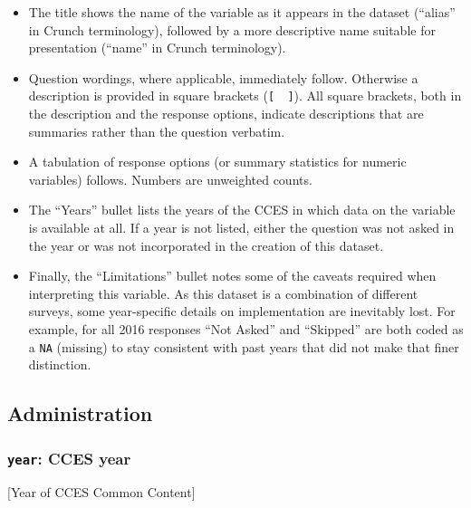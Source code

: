 \documentclass[10pt,article,oneside]{memoir}
\begin{document}
\begin{itemize}
\tightlist
\item
  The title shows the name of the variable as it appears in the dataset
  (``alias'' in Crunch terminology), followed by a more descriptive name
  suitable for presentation (``name'' in Crunch terminology).
\item
  Question wordings, where applicable, immediately follow. Otherwise a
  description is provided in square brackets (\texttt{{[}\ \ {]}}). All
  square brackets, both in the description and the response options,
  indicate descriptions that are summaries rather than the question
  verbatim.
\item
  A tabulation of response options (or summary statistics for numeric
  variables) follows. Numbers are unweighted counts.
\item
  The ``Years'' bullet lists the years of the CCES in which data on the
  variable is available at all. If a year is not listed, either the
  question was not asked in the year or was not incorporated in the
  creation of this dataset.
\item
  Finally, the ``Limitations'' bullet notes some of the caveats required
  when interpreting this variable. As this dataset is a combination of
  different surveys, some year-specific details on implementation are
  inevitably lost. For example, for all 2016 responses ``Not Asked'' and
  ``Skipped'' are both coded as a \texttt{NA} (missing) to stay
  consistent with past years that did not make that finer distinction.
\end{itemize}

\subsection{Administration}\label{administration}

\subsubsection{\texorpdfstring{\texttt{year}: CCES
year}{year: CCES year}}\label{year-cces-year}

{[}Year of CCES Common Content{]}
\end{document}
